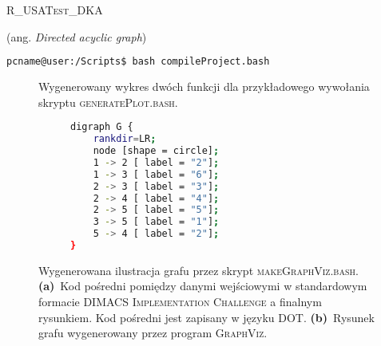 \textsc{R\_USATest\_DKA}

(ang. \textit{Directed acyclic graph})

\begin{lstlisting}[language=bash]
pcname@user:/Scripts$ bash compileProject.bash
\end{lstlisting}


\begin{figure}[!htbp]
	\null\hfill
	\hfill\null
	\caption{
		Wygenerowany wykres dwóch funkcji dla przykładowego wywołania skryptu \textsc{generatePlot.bash}.
	}
\end{figure}


\begin{figure}[!htbp]
	\null\hfill
	\begin{subfigure}[b]{0.49\textwidth}
		\footnotesize
		\begin{lstlisting}[language=bash]
digraph G {
	rankdir=LR;
	node [shape = circle];
	1 -> 2 [ label = "2"];
	1 -> 3 [ label = "6"];
	2 -> 3 [ label = "3"];
	2 -> 4 [ label = "4"];
	2 -> 5 [ label = "5"];
	3 -> 5 [ label = "1"];
	5 -> 4 [ label = "2"];
}
		\end{lstlisting}
		\caption{}
		\label{fig:graphViz:a}
	\end{subfigure}
	\hfill
	\begin{subfigure}[b]{0.49\textwidth}
		\vspace{1em}
		\caption{}
		\label{fig:graphViz:b}
	\end{subfigure}
	\hfill\null
	\caption{
		Wygenerowana ilustracja grafu przez skrypt \textsc{makeGraphViz.bash}.
		\textbf{(a)}~Kod pośredni pomiędzy danymi wejściowymi w standardowym formacie \textsc{DIMACS Implementation Challenge} a finalnym rysunkiem. Kod pośredni jest zapisany w języku \textsc{DOT}.
		\textbf{(b)}~Rysunek grafu wygenerowany przez program \textsc{GraphViz}.
	}
	\label{fig:graphViz}
\end{figure}

